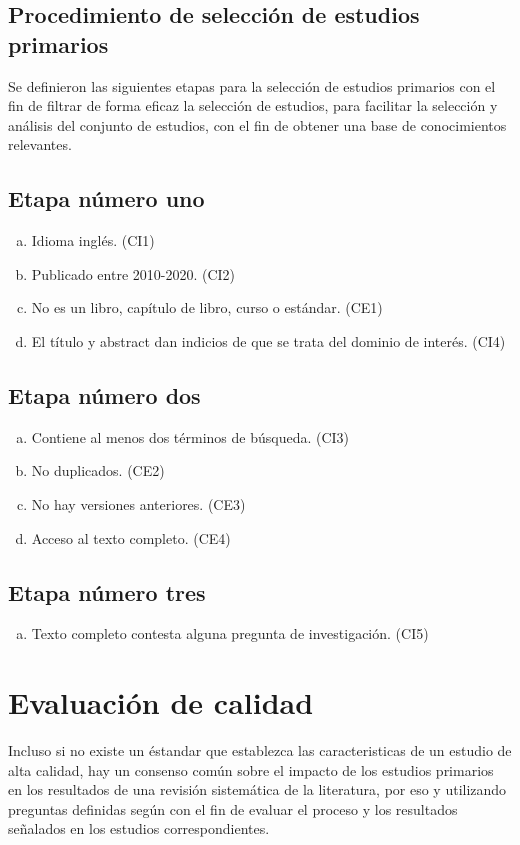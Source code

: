 \documentclass{article}
\begin{document}
\subsection{Procedimiento de selección de estudios primarios}
Se definieron las siguientes etapas para la selección de estudios primarios con el fin 
de filtrar de forma eficaz la selección de estudios, para facilitar la selección y análisis 
del conjunto de estudios, con el fin de obtener una base de conocimientos relevantes. 

\subsection{Etapa número uno}
\begin{enumerate}[(a)]
  \item{Idioma inglés. (CI1)}
  \item{Publicado entre 2010-2020. (CI2)}
  \item{No es un libro, capítulo de libro, curso o estándar. (CE1)}
  \item{El título y abstract dan indicios de que se trata del dominio de interés. (CI4)}
\end{enumerate}

\subsection{Etapa número dos}
\begin{enumerate}[(a)]
  \item{Contiene al menos dos términos de búsqueda. (CI3)}
  \item{No duplicados. (CE2)}
  \item{No hay versiones anteriores. (CE3) }
  \item{Acceso al texto completo. (CE4)}
\end{enumerate}

\subsection{Etapa número tres}
\begin{enumerate}[(a)]
  \item{Texto completo contesta alguna pregunta de investigación. (CI5)}
\end{enumerate}
\newpage

\section{Evaluación de calidad}
Incluso si no existe un éstandar que establezca las caracteristicas de un estudio 
de alta calidad, hay un consenso común sobre el impacto de los estudios primarios 
en los resultados de una revisión sistemática de la literatura, por eso y utilizando 
preguntas definidas según \cite{Evidence-Based} con el fin de evaluar el proceso y los
resultados señalados en los estudios correspondientes. 
\end{document}
